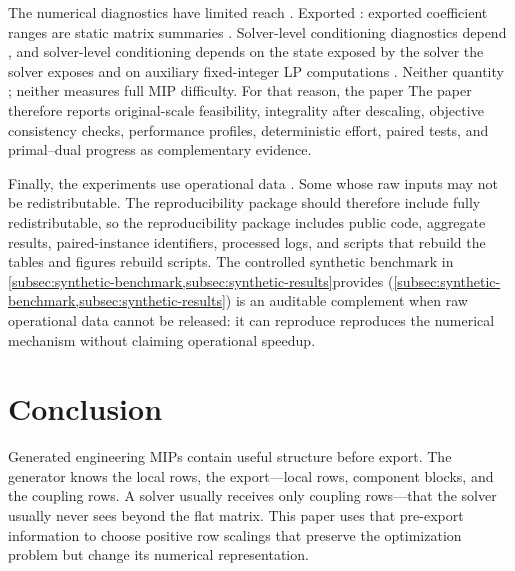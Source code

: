 \documentclass[AMA,Times1COL]{WileyNJDv5} %
\providecommand{\DIFadd}[1]{{\protect\color{blue} \sf #1}} %
\providecommand{\DIFdel}[1]{{\protect\color{red} \scriptsize #1}} %
\providecommand{\DIFaddbegin}{} %
\providecommand{\DIFaddend}{} %
\providecommand{\DIFdelbegin}{} %
\providecommand{\DIFdelend}{} %
\begin{document}
\DIFaddend The numerical diagnostics have limited reach\DIFdelbegin \DIFdel{. Exported }\DIFdelend \DIFaddbegin \DIFadd{: exported }\DIFaddend coefficient ranges are static matrix
summaries\DIFdelbegin \DIFdel{. Solver-level conditioning diagnostics depend }\DIFdelend \DIFaddbegin \DIFadd{, and solver-level conditioning depends }\DIFaddend on the state \DIFdelbegin \DIFdel{exposed by the solver }\DIFdelend \DIFaddbegin \DIFadd{the solver exposes }\DIFaddend and on auxiliary
fixed-integer LP computations\DIFdelbegin \DIFdel{. Neither quantity }\DIFdelend \DIFaddbegin \DIFadd{; neither }\DIFaddend measures full MIP difficulty. \DIFdelbegin \DIFdel{For that reason, the paper }\DIFdelend \DIFaddbegin \DIFadd{The paper therefore }\DIFaddend reports
original-scale feasibility, integrality after descaling, objective \DIFdelbegin \DIFdel{consistency }\DIFdelend checks, performance profiles,
deterministic effort, paired tests, and primal--dual progress as complementary evidence.

Finally, the experiments use operational data \DIFdelbegin \DIFdel{. Some }\DIFdelend \DIFaddbegin \DIFadd{whose }\DIFaddend raw inputs may not be \DIFdelbegin \DIFdel{redistributable. The reproducibility package should therefore include }\DIFdelend \DIFaddbegin \DIFadd{fully redistributable,
so the reproducibility package includes }\DIFaddend public code, aggregate results, paired-instance
identifiers, processed logs, and \DIFdelbegin \DIFdel{scripts that rebuild the tables and figures}\DIFdelend \DIFaddbegin \DIFadd{rebuild scripts}\DIFaddend . The controlled synthetic benchmark
\DIFdelbegin \DIFdel{in \cref{subsec:synthetic-benchmark,subsec:synthetic-results}provides }\DIFdelend \DIFaddbegin \DIFadd{(\cref{subsec:synthetic-benchmark,subsec:synthetic-results}) is }\DIFaddend an auditable complement when raw
\DIFdelbegin \DIFdel{operational }\DIFdelend data cannot be released: it \DIFdelbegin \DIFdel{can reproduce }\DIFdelend \DIFaddbegin \DIFadd{reproduces }\DIFaddend the numerical mechanism without claiming operational
speedup.


\section{Conclusion}
\label{sec:conclusion}

Generated \DIFdelbegin \DIFdel{engineering }\DIFdelend MIPs contain useful structure before \DIFdelbegin \DIFdel{export. The generator knows the
local rows, the }\DIFdelend \DIFaddbegin \DIFadd{export---local rows, }\DIFaddend component
blocks, and \DIFdelbegin \DIFdel{the coupling rows. A solver usually receives only }\DIFdelend \DIFaddbegin \DIFadd{coupling rows---that the solver usually never sees beyond }\DIFaddend the flat matrix. This paper
uses that pre-export information to choose positive row scalings that preserve the optimization
problem but change its numerical representation.
\end{document}

